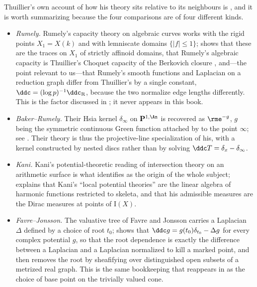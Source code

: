 Thuillier's own account of how his theory sits relative to its neighbours is
\cite[\S\S5.1--5.4]{Thu05}, and it is worth summarizing because the four
comparisons are of four different kinds.
\begin{itemize}
\item \emph{Rumely.}  Rumely's capacity theory on algebraic curves works with
the rigid points $X_1=X(k)$ and with lemniscate domains
$\{|f|\leq1\}$; \cite[\S5.1]{Thu05} shows that these are the traces on
$X_1$ of strictly affinoid domains, that Rumely's algebraic capacity is
Thuillier's Choquet capacity of the Berkovich closure
\cite[Thm.~5.1.2]{Thu05}, and---the point relevant to us---that Rumely's
smooth functions and Laplacian on a reduction graph differ from Thuillier's
by a single constant, $\ddc=(\log p)^{-1}\ddc_{\mathrm R}$, because the
two normalize edge lengths differently.  This is the factor discussed in
; it never appears in this book.
\item \emph{Baker--Rumely.}  Their Hsia kernel $\delta_\infty$ on
$\mathbf P^{1,\An}$ is recovered as $\rme^{-g}$, $g$ being the
symmetric continuous Green function attached by
\cite[Thm.~5.1.5]{Thu05} to the point $\infty$; see
\cite[\S5.2]{Thu05}.  Their theory is thus the projective-line specialization
of his, with a kernel constructed by nested discs rather than by solving
$\ddc T=\delta_x-\delta_\infty$.
\item \emph{Kani.}  Kani's potential-theoretic reading of intersection theory
on an arithmetic surface is what \cite{Thu05} identifies as the origin of the
whole subject; \cite[\S5.3]{Thu05} explains that Kani's ``local potential
theories'' are the linear algebra of harmonic functions restricted to
skeleta, and that his admissible measures are the Dirac measures at points of
$\mathrm I(X)$.
\item \emph{Favre--Jonsson.}  The valuative tree of Favre and Jonsson carries
a Laplacian $\Delta$ defined by a choice of root $t_0$;
\cite[Prop.~5.4.2]{Thu05} shows that $\ddc g=g(t_0)\delta_{t_0}-\Delta g$
for every complex potential $g$, so that the root dependence is exactly the
difference between a Laplacian and a Laplacian normalized to kill a marked
point, and \cite[\S5.4]{Thu05} then removes the root by sheafifying over
distinguished open subsets of a metrized real graph.  This is the same
bookkeeping that reappears in  as the choice of base point on
the trivially valued cone.
\end{itemize}

